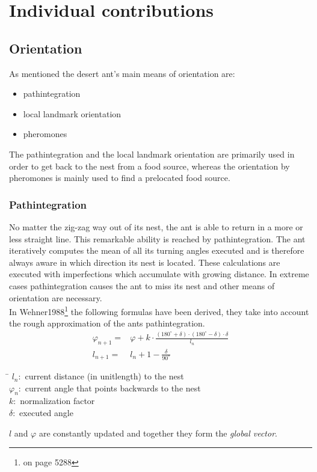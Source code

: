 \documentclass[11pt]{article}
\begin{document}
\newpage
\section{Individual contributions}
\subsection{Orientation}
As mentioned the desert ant's main means of orientation are:
\begin{itemize}
\item pathintegration
\item local landmark orientation
\item pheromones
\end{itemize}
The pathintegration and the local landmark orientation are primarily used in order to get back to the nest from a food source, whereas the orientation by pheromones is mainly used to find a prelocated food source. 

\subsubsection{Pathintegration}
No matter the zig-zag way out of its nest, the ant is able to return in a more or less straight line. This remarkable ability is reached by pathintegration. The ant iteratively computes the mean of all its turning angles executed and is therefore always aware in which direction its nest is located. These calculations are executed with imperfections which accumulate with growing distance. In extreme cases pathintegration causes the ant to miss its nest and other means of orientation are necessary. \\
In Wehner1988\cite{Wehner1988}\footnote{on page 5288} the following formulas have been derived, they take into account the rough approximation of the ants pathintegration. 
\begin{align*}
\varphi_{n+1} =& \varphi +k \cdot \frac{(180^{\circ} + \delta)\cdot(180^{\circ} - \delta)\cdot\delta}{l_{n}} \\
l_{n+1} =& l_{n}+ 1 - \frac{\delta}{90^{\circ}}
\end{align*}
\begin{tabbing}
\hspace{1cm}\=\kill
$l_{n}:$ \> current distance (in unitlength) to the nest \\ 
$\varphi_{n}:$ \> current angle that points backwards to the nest \\ 
$k:$ \>  normalization factor\\ 
$\delta:$ \>  executed angle\\ 
\end{tabbing} 
$l$ and $\varphi$ are constantly updated and together they form the \textit{global vector}.
\end{document}
